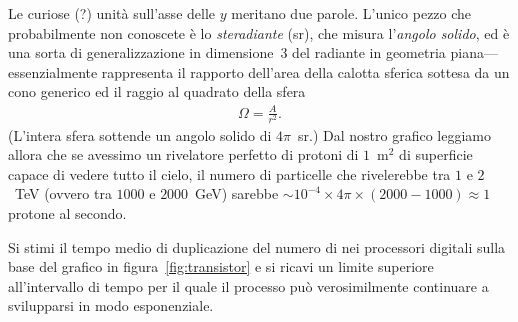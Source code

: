 \begin{solution}
Le curiose (?) unità sull'asse delle $y$ meritano due parole. L'unico pezzo che
probabilmente non conoscete è lo \emph{steradiante} (sr), che misura
l'\emph{angolo solido}, ed è una sorta di generalizzazione in dimensione~3
del radiante in geometria piana---essenzialmente rappresenta il rapporto
dell'area della calotta sferica sottesa da un cono generico ed il raggio al
quadrato della sfera
\begin{align*}
  \Omega = \frac{A}{r^2}.
\end{align*}
(L'intera sfera sottende un angolo solido di $4\pi$~sr.) Dal nostro grafico leggiamo
allora che se avessimo un rivelatore perfetto di protoni di $1$~m$^2$ di superficie capace
di vedere tutto il cielo, il numero di particelle che rivelerebbe tra $1$ e $2$~TeV
(ovvero tra $1000$ e $2000$~GeV) sarebbe
$\sim 10^{-4} \times 4\pi \times (2000 - 1000) \approx 1$ protone al secondo.

\end{solution}



\begin{exercise}

Si stimi il tempo medio di duplicazione del numero di  nei
processori digitali sulla base del grafico in figura~\ref{fig:transistor} e si
ricavi un limite superiore all'intervallo di tempo per il quale il processo può
verosimilmente continuare a svilupparsi in modo esponenziale.


\end{exercise}


